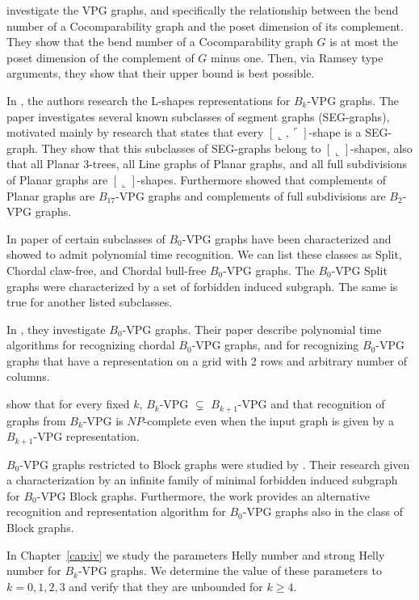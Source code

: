 \citet{cohen2016posets} investigate the VPG graphs, and specifically the relationship between the bend number of a Cocomparability graph and the poset dimension of its complement. They show that the bend number of a Cocomparability graph $G$ is at most the poset dimension of the complement of $G$ minus one. Then, via Ramsey type arguments, they show that their upper bound is best  possible.


In \citet{felsner2016intersection}, the authors research the L-shapes representations for $B_k$-VPG graphs. The paper investigates several known subclasses of segment graphs (SEG-graphs), motivated mainly by research \cite{middendorf1992max} that states that every $[\llcorner, \ulcorner]$-shape is a SEG-graph.
They show that this subclasses of SEG-graphs belong to $[\llcorner]$-shapes, also that all Planar 3-trees, all Line graphs of Planar graphs, and all full subdivisions of Planar graphs are $[\llcorner]$-shapes. Furthermore \cite{felsner2016intersection} showed that complements of Planar graphs are $B_{17}$-VPG graphs and complements of full subdivisions are $B_2$-VPG graphs. 

In paper of \citet{golumbic2013intersection} certain subclasses of $B_0$-VPG graphs have been characterized and showed to admit polynomial time recognition. We can list these classes as Split, Chordal claw-free, and Chordal bull-free $B_0$-VPG graphs.
The $B_0$-VPG Split graphs were characterized by  a set of forbidden induced subgraph. The same is true for another listed subclasses.


In \citet{chaplick2011recognizing}, they investigate  $B_0$-VPG graphs. Their paper describe polynomial time
algorithms for recognizing chordal $B_0$-VPG graphs, and for recognizing $B_0$-VPG graphs that have a representation on a grid with 2 rows and arbitrary number of columns.

\citet{chaplick2012bend} show  that for every fixed $k$, $B_k$-VPG $\subsetneq$ $B_{k+1}$-VPG and that recognition of graphs from $B_k$-VPG is $NP$-complete even when the input graph is given by a $B_{k+1}$-VPG representation. 


$B_0$-VPG graphs restricted to Block graphs were studied by \citet{Alcn2017VertexIG}. Their research given a characterization by an infinite family of minimal forbidden induced subgraph  for $B_0$-VPG Block graphs. Furthermore, the work provides an alternative recognition and representation algorithm for $B_0$-VPG graphs also in the class of Block graphs.

In Chapter~\ref{cap:iv} we study the parameters Helly number  and strong Helly number for $B_k$-VPG graphs. We determine the value of these parameters to $ k = 0,1,2,3 $ and verify that they are unbounded for $ k\geq 4 $.



